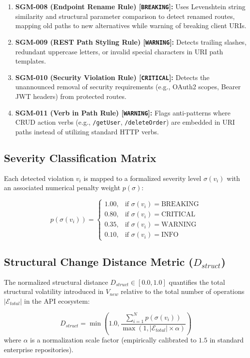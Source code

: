 \documentclass[conference]{IEEEtran}
\begin{document}
\begin{enumerate}
    \item \textbf{SGM-008 (Endpoint Rename Rule) [\texttt{BREAKING}]:} Uses Levenshtein string similarity and structural parameter comparison to detect renamed routes, mapping old paths to new alternatives while warning of breaking client URIs.
    \item \textbf{SGM-009 (REST Path Styling Rule) [\texttt{WARNING}]:} Detects trailing slashes, redundant uppercase letters, or invalid special characters in URI path templates.
    \item \textbf{SGM-010 (Security Violation Rule) [\texttt{CRITICAL}]:} Detects the unannounced removal of security requirements (e.g., OAuth2 scopes, Bearer JWT headers) from protected routes.
    \item \textbf{SGM-011 (Verb in Path Rule) [\texttt{WARNING}]:} Flags anti-patterns where CRUD action verbs (e.g., \texttt{/getUser}, \texttt{/deleteOrder}) are embedded in URI paths instead of utilizing standard HTTP verbs.
\end{enumerate}

\subsection{Severity Classification Matrix}
Each detected violation $v_i$ is mapped to a formalized severity level $\sigma(v_i)$ with an associated numerical penalty weight $p(\sigma)$:

\begin{equation}
p(\sigma(v_i)) = \begin{cases} 
1.00, & \text{if } \sigma(v_i) = \text{BREAKING} \\
0.80, & \text{if } \sigma(v_i) = \text{CRITICAL} \\
0.35, & \text{if } \sigma(v_i) = \text{WARNING} \\
0.10, & \text{if } \sigma(v_i) = \text{INFO}
\end{cases}
\end{equation}

\subsection{Structural Change Distance Metric ($D_{struct}$)}
The normalized structural distance $D_{struct} \in [0.0, 1.0]$ quantifies the total structural volatility introduced in $V_{new}$ relative to the total number of operations $|\mathcal{E}_{total}|$ in the API ecosystem:

\begin{equation}
D_{struct} = \min\left(1.0, \frac{\sum_{i=1}^{N} p(\sigma(v_i))}{\max(1, |\mathcal{E}_{total}| \times \alpha)}\right)
\label{eq:d_struct}
\end{equation}
where $\alpha$ is a normalization scale factor (empirically calibrated to $1.5$ in standard enterprise repositories).
\end{document}
